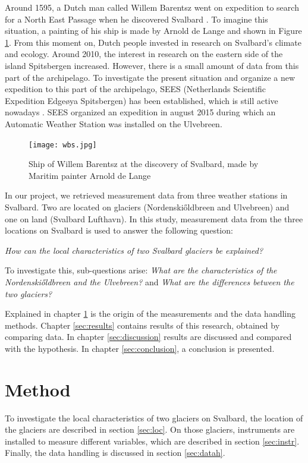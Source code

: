 \documentclass[11pt]{report}
\begin{document}
Around 1595, a Dutch man called Willem Barentsz went on expedition to search for a North East Passage when he discovered Svalbard \cite{sval}. To imagine this situation, a painting of his ship is made by Arnold de Lange and shown in Figure \ref{fig:wbs}. From this moment on, Dutch people invested in research on Svalbard's climate and ecology. Around 2010, the interest in research on the eastern side of the island Spitsbergen increased. However, there is a small amount of data from this part of the archipelago. To investigate the present situation and organize a new expedition to this part of the archipelago, SEES (Netherlands Scientific Expedition Edge\o ya Spitsbergen) has been established, which is still active nowadays \cite{sees}. SEES organized an expedition in august 2015 during which an Automatic Weather Station was installed on the Ulvebreen.

\begin{figure}[h]
\texttt{[image: wbs.jpg]}
\centering{}
\caption{Ship of Willem Barentsz at the discovery of Svalbard, made by Maritim painter Arnold de Lange}
\label{fig:wbs}
\end{figure}

In our project, we retrieved measurement data from three weather stations in Svalbard. Two are located on glaciers (Nordenski\H{o}ldbreen and Ulvebreen) and one on land (Svalbard Lufthavn). In this study, measurement data from the three locations on Svalbard is used to answer the following question:

\textit{How can the local characteristics of two Svalbard glaciers be explained?}

To investigate this, sub-questions arise:
\textit{What are the characteristics of the Nordenski\H{o}ldbreen and the Ulvebreen?} and \textit{What are the differences between the two glaciers?}

Explained in chapter \ref{sec:method} is the origin of the measurements and the data handling methods. Chapter \ref{sec:results} contains results of this research, obtained by comparing data. In chapter \ref{sec:discussion} results are discussed and compared with the hypothesis. In chapter \ref{sec:conclusion}, a conclusion is presented.

\newpage

\chapter{Method}\label{sec:method}

To investigate the local characteristics of two glaciers on Svalbard, the location of the glaciers are described in section \ref{sec:loc}. On those glaciers, instruments are installed to measure different variables, which are described in section \ref{sec:instr}. Finally, the data handling is discussed in section \ref{sec:datah}.
\end{document}
